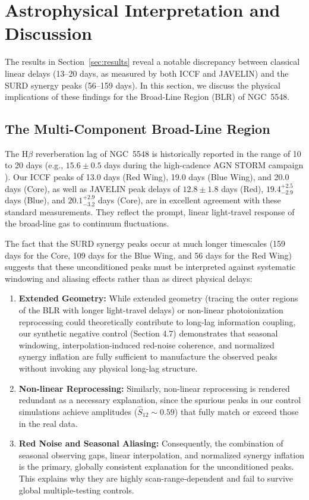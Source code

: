 \documentclass[fleqn,usenatbib]{mnras}
\begin{document}
\section{Astrophysical Interpretation and Discussion}
\label{sec:discussion}

The results in Section~\ref{sec:results} reveal a notable discrepancy between classical linear delays (13--20 days, as measured by both ICCF and JAVELIN) and the SURD synergy peaks (56--159 days). In this section, we discuss the physical implications of these findings for the Broad-Line Region (BLR) of NGC~5548.

\subsection{The Multi-Component Broad-Line Region}

The H\(\beta\) reverberation lag of NGC~5548 is historically reported in the range of 10 to 20 days (e.g., $15.6 \pm 0.5$ days during the high-cadence AGN STORM campaign \cite{Pei2017}). Our ICCF peaks of 13.0 days (Red Wing), 19.0 days (Blue Wing), and 20.0 days (Core), as well as JAVELIN peak delays of $12.8 \pm 1.8$ days (Red), $19.4_{-2.9}^{+2.5}$ days (Blue), and $20.1_{-3.2}^{+2.9}$ days (Core), are in excellent agreement with these standard measurements. They reflect the prompt, linear light-travel response of the broad-line gas to continuum fluctuations.

The fact that the SURD synergy peaks occur at much longer timescales (159 days for the Core, 109 days for the Blue Wing, and 56 days for the Red Wing) suggests that these unconditioned peaks must be interpreted against systematic windowing and aliasing effects rather than as direct physical delays:
\begin{enumerate}
\item \textbf{Extended Geometry:} While extended geometry (tracing the outer regions of the BLR with longer light-travel delays) or non-linear photoionization reprocessing could theoretically contribute to long-lag information coupling, our synthetic negative control (Section 4.7) demonstrates that seasonal windowing, interpolation-induced red-noise coherence, and normalized synergy inflation are fully sufficient to manufacture the observed peaks without invoking any physical long-lag structure.
\item \textbf{Non-linear Reprocessing:} Similarly, non-linear reprocessing is rendered redundant as a necessary explanation, since the spurious peaks in our control simulations achieve amplitudes ($\widehat{S}_{12} \sim 0.59$) that fully match or exceed those in the real data.
\item \textbf{Red Noise and Seasonal Aliasing:} Consequently, the combination of seasonal observing gaps, linear interpolation, and normalized synergy inflation is the primary, globally consistent explanation for the unconditioned peaks. This explains why they are highly scan-range-dependent and fail to survive global multiple-testing controls.
\end{enumerate}
\end{document}
